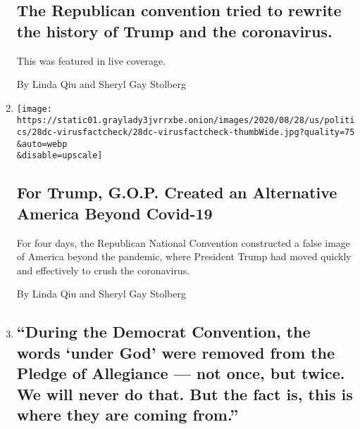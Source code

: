 \begin{enumerate}
  \hypertarget{the-republican-convention-tried-to-rewrite-the-history-of-trump-and-the-coronavirus}{%
  \subsection{The Republican convention tried to rewrite the history of
  Trump and the
  coronavirus.}\label{the-republican-convention-tried-to-rewrite-the-history-of-trump-and-the-coronavirus}}

  This was featured in live coverage.

  By Linda Qiu and Sheryl Gay Stolberg
\item
  \href{/2020/08/28/us/politics/trump-coronavirus-fact-check.html}{}

  \texttt{[image: https://static01.graylady3jvrrxbe.onion/images/2020/08/28/us/politics/28dc-virusfactcheck/28dc-virusfactcheck-thumbWide.jpg?quality=75\\\&auto=webp\\\&disable=upscale]}

  \hypertarget{for-trump-gop-created-an-alternative-america-beyond-covid-19}{%
  \subsection{For Trump, G.O.P. Created an Alternative America Beyond
  Covid-19}\label{for-trump-gop-created-an-alternative-america-beyond-covid-19}}

  For four days, the Republican National Convention constructed a false
  image of America beyond the pandemic, where President Trump had moved
  quickly and effectively to crush the coronavirus.

  By Linda Qiu and Sheryl Gay Stolberg
\item
  \href{/live/2020/08/27/us/rnc-fact-check/during-the-democrat-convention-the-words-under-god-were-removed-from-the-pledge-of-allegiance-not-once-but-twice-we-will-never-d}{}

  \hypertarget{during-the-democrat-convention-the-words-under-god-were-removed-from-the-pledge-of-allegiance--not-once-but-twice-we-will-never-do-that-but-the-fact-is-this-is-where-they-are-coming-from}{%
  \subsection{``During the Democrat Convention, the words `under God'
  were removed from the Pledge of Allegiance --- not once, but twice. We
  will never do that. But the fact is, this is where they are coming
  from.''}\label{during-the-democrat-convention-the-words-under-god-were-removed-from-the-pledge-of-allegiance--not-once-but-twice-we-will-never-do-that-but-the-fact-is-this-is-where-they-are-coming-from}}


\end{enumerate}
